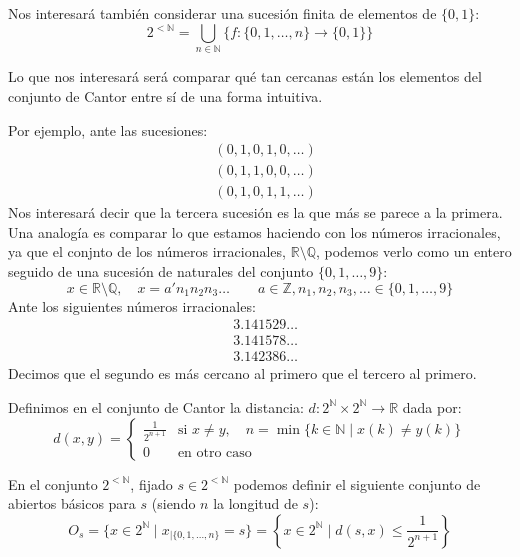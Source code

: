 \begin{notacion}
    Nos interesará también considerar una sucesión finita de elementos de $\{0,1\}$: 
    \begin{equation*}
        2^{<\mathbb{N}} = \bigcup_{n\in \mathbb{N}} \{f:\{0,1,\ldots,n\} \to \{0,1\}\}
    \end{equation*}
\end{notacion}

\noindent
Lo que nos interesará será comparar qué tan cercanas están los elementos del conjunto de Cantor entre sí de una forma intuitiva.
\begin{ejemplo}
    Por ejemplo, ante las sucesiones:
    \begin{align*}
        &(0, 1, 0, 1, 0, \ldots) \\
        &(0, 1, 1, 0, 0, \ldots) \\
        &(0, 1, 0, 1, 1, \ldots)
    \end{align*}
    Nos interesará decir que la tercera sucesión es la que más se parece a la primera. Una analogía es comparar lo que estamos haciendo con los números irracionales, ya que el conjnto de los números irracionales, $\mathbb{R}\setminus\mathbb{Q}$, podemos verlo como un entero seguido de una sucesión de naturales del conjunto $\{0,1,\ldots,9\}$:
    \begin{equation*}
        x\in \mathbb{R}\setminus\mathbb{Q}, \quad x = a'n_1 n_2 n_3 \ldots \qquad a\in \mathbb{Z}, n_1,n_2,n_3, \ldots \in \{0,1,\ldots, 9\}
    \end{equation*}
    Ante los siguientes números irracionales:
    \begin{align*}
        &3.141529\ldots \\
        &3.141578\ldots \\
        &3.142386\ldots
    \end{align*}
    Decimos que el segundo es más cercano al primero que el tercero al primero.
\end{ejemplo}

\begin{definicion}
    Definimos en el conjunto de Cantor la distancia: $d:2^\mathbb{N}\times 2^\mathbb{N}\to \mathbb{R}$ dada por:
    \begin{equation*}
        d(x,y) = \left\{\begin{array}{ll}
                \frac{1}{2^{n+1}} &\text{si\ }  x\neq y, \quad n = \min\{k\in \mathbb{N} \mid x(k) \neq y(k)\} \\
                0 &\text{en otro caso}
        \end{array}\right.
    \end{equation*}
\end{definicion}
En el conjunto $2^{<\mathbb{N}}$, fijado $s\in 2^{<\mathbb{N}}$ podemos definir el siguiente conjunto de abiertos básicos para $s$ (siendo $n$ la longitud de $s$):
\begin{equation*}
    O_s = \{x\in 2^\mathbb{N} \mid x_{|\{0,1,\ldots,n\}} = s\} = \left\{x\in 2^\mathbb{N} \mid d(s,x) \leq \frac{1}{2^{n+1}} \right\}
\end{equation*}

